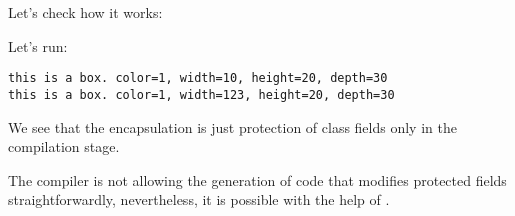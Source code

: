 

Let's check how it works:



Let's run:

\begin{lstlisting}
this is a box. color=1, width=10, height=20, depth=30
this is a box. color=1, width=123, height=20, depth=30
\end{lstlisting}

We see that the encapsulation is just protection of class fields only in the compilation stage.

The \Cpp compiler is not allowing the generation of code that modifies protected 
fields straightforwardly, nevertheless,
it is possible with the help of .

